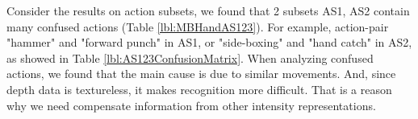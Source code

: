 \documentclass[review]{elsarticle}
\begin{document}
Consider the results on action subsets, we found that 2 subsets AS1, AS2 contain many confused actions (Table \ref{lbl:MBHandAS123}). For example, action-pair "hammer" and "forward punch" in AS1, or "side-boxing" and "hand catch" in AS2, as showed in Table \ref{lbl:AS123ConfusionMatrix}. When analyzing confused actions, we found that the main cause is due to similar movements. And, since depth data is textureless, it makes recognition more difficult. That is a reason why we need compensate information from other intensity representations.

\begin{table}[H]
	\begin{center}
\end{center}
\end{table}
\end{document}
